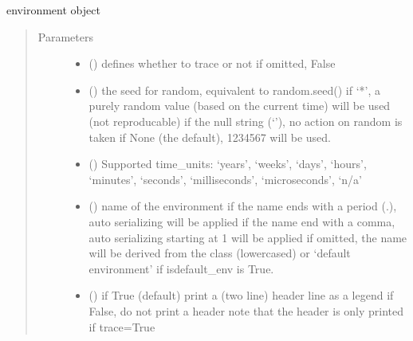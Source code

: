 \documentclass[letterpaper,10pt,english]{sphinxmanual}
\begin{document}
\begin{fulllineitems}
\label{\detokenize{Reference:salabim.Environment}}
environment object
\begin{quote}\begin{description}
\item[{Parameters}] \leavevmode\begin{itemize}
\item {} 
 () \textendash{} defines whether to trace or not 
if omitted, False

\item {} 
 (\sphinxstyleliteralemphasis{\sphinxupquote{, }}) \textendash{} the seed for random, equivalent to random.seed() 
if ‘*’, a purely random value (based on the current time) will be used
(not reproducable) 
if the null string (‘’), no action on random is taken 
if None (the default), 1234567 will be used.

\item {} 
 () \textendash{} Supported time\_units: 
‘years’, ‘weeks’, ‘days’, ‘hours’, ‘minutes’, ‘seconds’, ‘milliseconds’, ‘microseconds’, ‘n/a’

\item {} 
 () \textendash{} name of the environment 
if the name ends with a period (.),
auto serializing will be applied 
if the name end with a comma,
auto serializing starting at 1 will be applied 
if omitted, the name will be derived from the class (lowercased)
or ‘default environment’ if isdefault\_env is True.

\item {} 
 () \textendash{} if True (default) print a (two line) header line as a legend 
if False, do not print a header 
note that the header is only printed if trace=True


\end{itemize}
\end{description}
\end{quote}
\end{fulllineitems}
\end{document}
